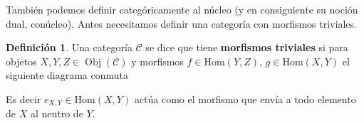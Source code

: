 \documentclass[12pt]{book}
\theoremstyle{definition}
\newtheorem{defn}[teo]{Definición}
\renewcommand{\hom}{\mathrm{Hom}}
\DeclareMathOperator{\Obj}{Obj}
\begin{document}
También podemos definir categóricamente al núcleo (y en consiguiente su noción dual, conúcleo). Antes necesitamos definir una categoría con morfismos triviales.
\begin{defn}
Una categoría $\mathcal{C}$ se dice que tiene \textbf{morfismos triviales} si para objetos $X,Y,Z\in\Obj(\mathcal{C})$ y morfismos $f\in \hom(Y,Z)$, $g\in\hom(X,Y)$ el siguiente diagrama conmuta
\begin{center}
\end{center}
Es decir $e_{X,Y}\in\hom(X,Y)$ actúa como el morfismo que envía a todo elemento de $X$ al neutro de $Y$.
\end{defn}
\end{document}
